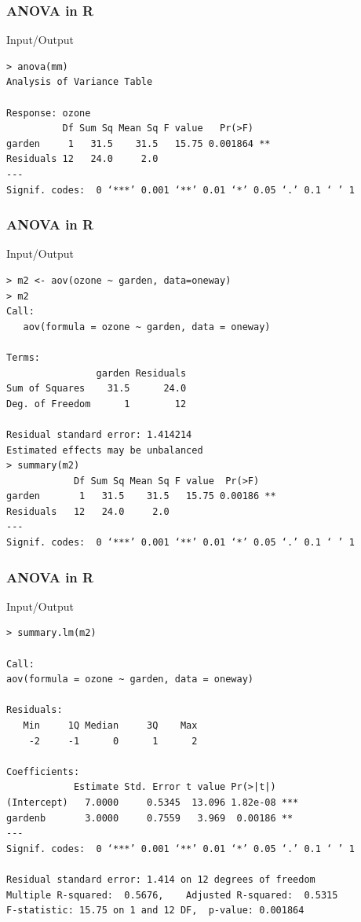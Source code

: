 \begin{frame}[fragile]\frametitle{ANOVA in R}
  \begin{exampleblock}{Input/Output}\footnotesize
\begin{verbatim}
> anova(mm)
Analysis of Variance Table

Response: ozone
          Df Sum Sq Mean Sq F value   Pr(>F)   
garden     1   31.5    31.5   15.75 0.001864 **
Residuals 12   24.0     2.0                    
---
Signif. codes:  0 ‘***’ 0.001 ‘**’ 0.01 ‘*’ 0.05 ‘.’ 0.1 ‘ ’ 1
\end{verbatim}
  \end{exampleblock}
\end{frame}



\begin{frame}[fragile]\frametitle{ANOVA in R}
  \begin{exampleblock}{Input/Output}\footnotesize
\begin{verbatim}
> m2 <- aov(ozone ~ garden, data=oneway)
> m2
Call:
   aov(formula = ozone ~ garden, data = oneway)

Terms:
                garden Residuals
Sum of Squares    31.5      24.0
Deg. of Freedom      1        12

Residual standard error: 1.414214
Estimated effects may be unbalanced
> summary(m2)
            Df Sum Sq Mean Sq F value  Pr(>F)   
garden       1   31.5    31.5   15.75 0.00186 **
Residuals   12   24.0     2.0                   
---
Signif. codes:  0 ‘***’ 0.001 ‘**’ 0.01 ‘*’ 0.05 ‘.’ 0.1 ‘ ’ 1
\end{verbatim}
  \end{exampleblock}
\end{frame}

\begin{frame}[fragile]\frametitle{ANOVA in R}
  \begin{exampleblock}{Input/Output}\scriptsize
\begin{verbatim}
> summary.lm(m2)

Call:
aov(formula = ozone ~ garden, data = oneway)

Residuals:
   Min     1Q Median     3Q    Max 
    -2     -1      0      1      2 

Coefficients:
            Estimate Std. Error t value Pr(>|t|)    
(Intercept)   7.0000     0.5345  13.096 1.82e-08 ***
gardenb       3.0000     0.7559   3.969  0.00186 ** 
---
Signif. codes:  0 ‘***’ 0.001 ‘**’ 0.01 ‘*’ 0.05 ‘.’ 0.1 ‘ ’ 1

Residual standard error: 1.414 on 12 degrees of freedom
Multiple R-squared:  0.5676,	Adjusted R-squared:  0.5315 
F-statistic: 15.75 on 1 and 12 DF,  p-value: 0.001864

\end{verbatim}
  \end{exampleblock}
\end{frame}



